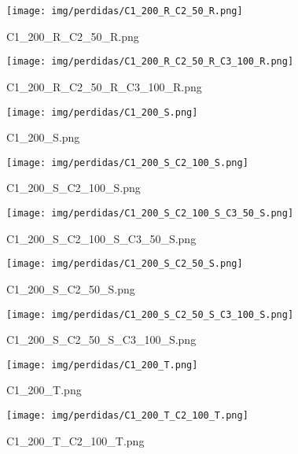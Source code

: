 \begin{figure}[H]
    \centerline{\texttt{[image: img/perdidas/C1\_200\_R\_C2\_50\_R.png]}}
    \caption{C1_200_R_C2_50_R.png}
    \label{fig:C1_200_R_C2_50_R.png}
\end{figure}

\begin{figure}[H]
    \centerline{\texttt{[image: img/perdidas/C1\_200\_R\_C2\_50\_R\_C3\_100\_R.png]}}
    \caption{C1_200_R_C2_50_R_C3_100_R.png}
    \label{fig:C1_200_R_C2_50_R_C3_100_R.png}
\end{figure}

\begin{figure}[H]
    \centerline{\texttt{[image: img/perdidas/C1\_200\_S.png]}}
    \caption{C1_200_S.png}
    \label{fig:C1_200_S.png}
\end{figure}

\begin{figure}[H]
    \centerline{\texttt{[image: img/perdidas/C1\_200\_S\_C2\_100\_S.png]}}
    \caption{C1_200_S_C2_100_S.png}
    \label{fig:C1_200_S_C2_100_S.png}
\end{figure}

\begin{figure}[H]
    \centerline{\texttt{[image: img/perdidas/C1\_200\_S\_C2\_100\_S\_C3\_50\_S.png]}}
    \caption{C1_200_S_C2_100_S_C3_50_S.png}
    \label{fig:C1_200_S_C2_100_S_C3_50_S.png}
\end{figure}

\begin{figure}[H]
    \centerline{\texttt{[image: img/perdidas/C1\_200\_S\_C2\_50\_S.png]}}
    \caption{C1_200_S_C2_50_S.png}
    \label{fig:C1_200_S_C2_50_S.png}
\end{figure}

\begin{figure}[H]
    \centerline{\texttt{[image: img/perdidas/C1\_200\_S\_C2\_50\_S\_C3\_100\_S.png]}}
    \caption{C1_200_S_C2_50_S_C3_100_S.png}
    \label{fig:C1_200_S_C2_50_S_C3_100_S.png}
\end{figure}

\begin{figure}[H]
    \centerline{\texttt{[image: img/perdidas/C1\_200\_T.png]}}
    \caption{C1_200_T.png}
    \label{fig:C1_200_T.png}
\end{figure}

\begin{figure}[H]
    \centerline{\texttt{[image: img/perdidas/C1\_200\_T\_C2\_100\_T.png]}}
    \caption{C1_200_T_C2_100_T.png}
    \label{fig:C1_200_T_C2_100_T.png}
\end{figure}

